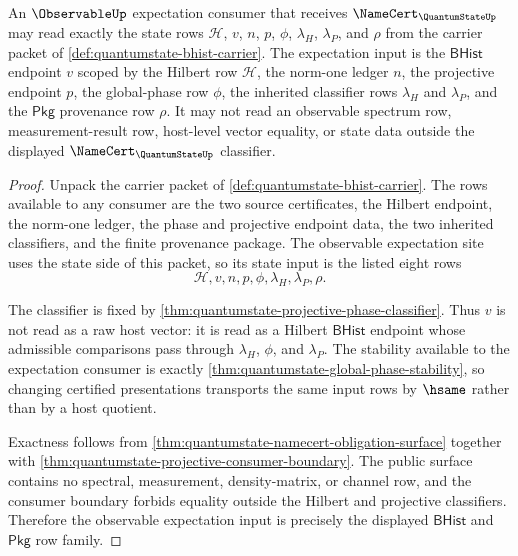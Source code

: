 \begin{theorem}
\label{thm:quantumstate-observable-expectation-input-exactness}
An $\ObservableUp$ expectation consumer that receives
$\NameCert_{\QuantumStateUp}$ may read exactly the state rows
$\mathcal{H}$, $v$, $n$, $p$, $\phi$, $\lambda_H$, $\lambda_P$, and $\rho$
from the carrier packet of \autoref{def:quantumstate-bhist-carrier}. The
expectation input is the $\mathsf{BHist}$ endpoint $v$ scoped by the
Hilbert row $\mathcal{H}$, the norm-one ledger $n$, the projective endpoint
$p$, the global-phase row $\phi$, the inherited classifier rows
$\lambda_H$ and $\lambda_P$, and the $\mathsf{Pkg}$ provenance row $\rho$.
It may not read an observable spectrum row, measurement-result row,
host-level vector equality, or state data outside the displayed
$\NameCert_{\QuantumStateUp}$ classifier.
\end{theorem}
\begin{proof}
Unpack the carrier packet of \autoref{def:quantumstate-bhist-carrier}. The
rows available to any consumer are the two source certificates, the Hilbert
endpoint, the norm-one ledger, the phase and projective endpoint data, the
two inherited classifiers, and the finite provenance package. The observable
expectation site uses the state side of this packet, so its state input is
the listed eight rows
$$
\mathcal{H},v,n,p,\phi,\lambda_H,\lambda_P,\rho.
$$

The classifier is fixed by
\autoref{thm:quantumstate-projective-phase-classifier}. Thus $v$ is not read
as a raw host vector: it is read as a Hilbert $\mathsf{BHist}$ endpoint
whose admissible comparisons pass through $\lambda_H$, $\phi$, and
$\lambda_P$. The stability available to the expectation consumer is exactly
\autoref{thm:quantumstate-global-phase-stability}, so changing certified
presentations transports the same input rows by $\hsame$ rather than by a
host quotient.

Exactness follows from
\autoref{thm:quantumstate-namecert-obligation-surface} together with
\autoref{thm:quantumstate-projective-consumer-boundary}. The public surface
contains no spectral, measurement, density-matrix, or channel row, and the
consumer boundary forbids equality outside the Hilbert and projective
classifiers. Therefore the observable expectation input is precisely the
displayed $\mathsf{BHist}$ and $\mathsf{Pkg}$ row family.
\end{proof}


